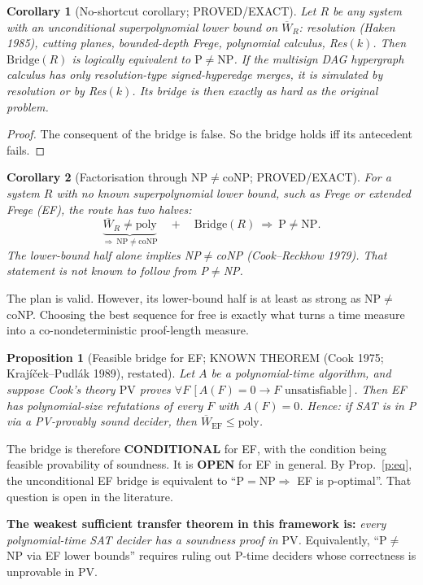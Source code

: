 \documentclass[11pt]{article}
\newtheorem{proposition}{Proposition}
\newtheorem{corollary}{Corollary}
\theoremstyle{definition}\newtheorem{definition}{Definition}
\begin{document}
\begin{corollary}[No-shortcut corollary; PROVED/EXACT]\label{c:weak}
Let $R$ be any system with an unconditional superpolynomial lower bound on $\overline W_R$: resolution (Haken 1985), cutting planes, bounded-depth Frege, polynomial calculus, Res$(k)$. Then $\mathrm{Bridge}(R)$ is logically equivalent to $\mathrm P\ne\mathrm{NP}$.
If the multisign DAG hypergraph calculus has only resolution-type signed-hyperedge merges, it is simulated by resolution or by Res$(k)$. Its bridge is then exactly as hard as the original problem.
\end{corollary}
\begin{proof}
The consequent of the bridge is false. So the bridge holds iff its antecedent fails.
\end{proof}

\begin{corollary}[Factorisation through NP$\neq$coNP; PROVED/EXACT]\label{c:fact}
For a system $R$ with no known superpolynomial lower bound, such as Frege or extended Frege (EF), the route has two halves:
\[
\underbrace{\overline W_R\ne\mathrm{poly}}_{\Rightarrow\ \mathrm{NP}\ne\mathrm{coNP}}\quad+\quad\mathrm{Bridge}(R)\ \Longrightarrow\ \mathrm P\ne\mathrm{NP}.
\]
The lower-bound half alone implies NP$\neq$coNP (Cook--Reckhow 1979). That statement is not known to follow from P$\neq$NP.
\end{corollary}
\noindent The plan is valid. However, its lower-bound half is at least as strong as NP$\neq$coNP. Choosing the best sequence for free is exactly what turns a time measure into a co-nondeterministic proof-length measure.

\begin{proposition}[Feasible bridge for EF; KNOWN THEOREM (Cook 1975; Krajíček--Pudlák 1989), restated]\label{p:ef}
Let $A$ be a polynomial-time algorithm, and suppose Cook's theory $\mathrm{PV}$ proves $\forall F\,[A(F)=0\to F\text{ unsatisfiable}]$. Then EF has polynomial-size refutations of every $F$ with $A(F)=0$.
Hence: if SAT is in P via a PV-provably sound decider, then $\overline W_{\mathrm{EF}}\le\mathrm{poly}$.
\end{proposition}
\noindent The bridge is therefore \textbf{CONDITIONAL} for EF, with the condition being feasible provability of soundness. It is \textbf{OPEN} for EF in general. By Prop.~\ref{p:eq}, the unconditional EF bridge is equivalent to ``$\mathrm P=\mathrm{NP}\Rightarrow$ EF is p-optimal''. That question is open in the literature.

\textbf{The weakest sufficient transfer theorem in this framework is:} \emph{every polynomial-time SAT decider has a soundness proof in $\mathrm{PV}$.} Equivalently, ``P$\ne$NP via EF lower bounds'' requires ruling out P-time deciders whose correctness is unprovable in PV.
\end{document}
